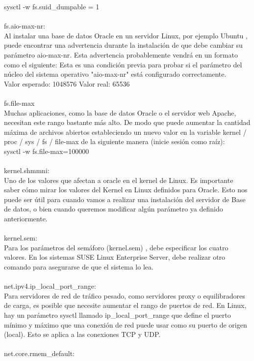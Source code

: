 \begin{enumerate}[1.]
 sysctl -w fs.suid\_dumpable = 1
\\
\\fs.aio-max-nr:
	\\Al instalar una base de datos Oracle en un servidor Linux, por ejemplo Ubuntu , puede encontrar una advertencia durante la instalación de que debe cambiar su parámetro aio-max-nr. Esta advertencia probablemente vendrá en un formato como el siguiente: 
Esta es una condición previa para probar si el parámetro del núcleo del sistema operativo "aio-max-nr" está configurado correctamente.
\\ 
Valor esperado: 1048576 
Valor real: 65536
\\
\\fs.file-max
\\Muchas aplicaciones, como la base de datos Oracle o el servidor web Apache, necesitan este rango bastante más alto. De modo que puede aumentar la cantidad máxima de archivos abiertos estableciendo un nuevo valor en la variable kernel / proc / sys / fs / file-max de la siguiente manera (inicie sesión como raíz): 
\\
 sysctl -w fs.file-max=100000
\\
\\kernel.shmmni:
\\Uno de los valores que afectan a oracle en el kernel de Linux. Es importante saber cómo mirar los valores del Kernel en Linux definidos para Oracle. Esto nos puede ser útil para cuando vamos a realizar una instalación del servidor de Base de datos, o bien cuando queremos modificar algún parámetro ya definido anteriormente.
\\
\\kernel.sem:
\\Para los parámetros del semáforo (kernel.sem) , debe especificar los cuatro valores.
En los sistemas SUSE Linux Enterprise Server, debe realizar otro comando para asegurarse de que el sistema lo lea.
\\
\\net.ipv4.ip\_local\_port\_range:
\\Para servidores de red de tráfico pesado, como servidores proxy o equilibradores de carga, es posible que necesite aumentar el rango de puertos de red.
En Linux, hay un parámetro sysctl llamado ip\_local\_port\_range que define el puerto mínimo y máximo que una conexión de red puede usar como su puerto de origen (local). Esto se aplica a las conexiones TCP y UDP.
\\
\\net.core.rmem\_default: 

\end{enumerate}
